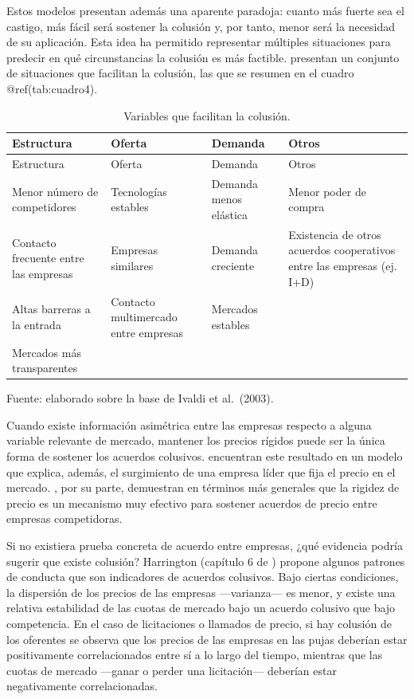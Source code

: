 \documentclass[
  12pt,
  spanish,
]{book}
\begin{document}
Estos modelos presentan además una aparente paradoja: cuanto más fuerte
sea el castigo, más fácil será sostener la colusión y, por tanto, menor
será la necesidad de su aplicación. Esta idea ha permitido representar
múltiples situaciones para predecir en qué circunstancias la colusión es
más factible. \citet{Ivaldi2003} presentan un conjunto de situaciones
que facilitan la colusión, las que se resumen en el cuadro
@ref(tab:cuadro4).

\begin{longtable}[]{@{}llll@{}}
\caption{Variables que facilitan la colusión.}\tabularnewline
\toprule
Estructura & Oferta & Demanda & Otros\tabularnewline
\midrule
\endfirsthead
\toprule
Estructura & Oferta & Demanda & Otros\tabularnewline
\midrule
\endhead
Menor número de competidores & Tecnologías estables & Demanda menos
elástica & Menor poder de compra\tabularnewline
Contacto frecuente entre las empresas & Empresas similares & Demanda
creciente & Existencia de otros acuerdos cooperativos entre las empresas
(ej. I+D)\tabularnewline
Altas barreras a la entrada & Contacto multimercado entre empresas &
Mercados estables &\tabularnewline
Mercados más transparentes & & &\tabularnewline
\bottomrule
\end{longtable}

Fuente: elaborado sobre la base de Ivaldi et al.~(2003).

Cuando existe información asimétrica entre las empresas respecto a
alguna variable relevante de mercado, mantener los precios rígidos puede
ser la única forma de sostener los acuerdos colusivos.
\citet{Rotemberg1990} encuentran este resultado en un modelo que
explica, además, el surgimiento de una empresa líder que fija el precio
en el mercado. \citet{Athey2004}, por su parte, demuestran en términos
más generales que la rigidez de precio es un mecanismo muy efectivo para
sostener acuerdos de precio entre empresas competidoras.

Si no existiera prueba concreta de acuerdo entre empresas, ¿qué
evidencia podría sugerir que existe colusión? Harrington (capítulo 6 de
\citet{Buccirossi2008}) propone algunos patrones de conducta que son
indicadores de acuerdos colusivos. Bajo ciertas condiciones, la
dispersión de los precios de las empresas ---varianza--- es menor, y
existe una relativa estabilidad de las cuotas de mercado bajo un acuerdo
colusivo que bajo competencia. En el caso de licitaciones o llamados de
precio, si hay colusión de los oferentes se observa que los precios de
las empresas en las pujas deberían estar positivamente correlacionados
entre sí a lo largo del tiempo, mientras que las cuotas de mercado
---ganar o perder una licitación--- deberían estar negativamente
correlacionadas.
\end{document}
